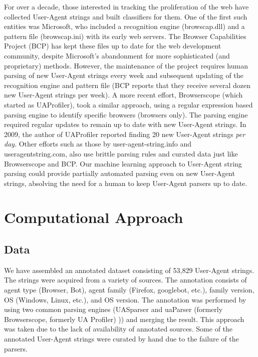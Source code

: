 \documentclass[10pt]{article}
\begin{document}
For over a decade, those interested in tracking the proliferation of the web have collected User-Agent strings and built classifiers for them.  One of the first such entities was Microsoft, who included a recognition engine (browscap.dll) and a pattern file (browscap.ini) with its early web servers.\cite{bcp}  The Browser Capabilities Project (BCP) has kept these files up to date for the web development community, despite Microsoft's abandonment for more sophisticated (and proprietary) methods.\cite{bcp}  However, the maintenance of the project requires human parsing of new User-Agent strings every week and subsequent updating of the recognition engine and pattern file (BCP reports that they receive several dozen new User-Agent strings per week).  A more recent effort, Browserscope (which started as UAProfiler), took a similar approach, using a regular expression based parsing engine to identify specific browsers (browsers only). \cite{souders}  The parsing engine required regular updates to remain up to date with new User-Agent strings.  In 2009, the author of UAProfiler reported finding 20 new User-Agent strings {\it per day}. \cite{souders2}  Other efforts such as those by user-agent-string.info and useragentstring.com, also use brittle parsing rules and curated data just like Browserscope and BCP.  \cite{uas.info,uas.com}   
Our machine learning approach to User-Agent string parsing could provide partially automated parsing even on new User-Agent strings, absolving the need for a human to keep User-Agent parsers up to date.      

\section{Computational Approach}
\subsection{Data}
We have assembled an annotated dataset consisting of 53,829 User-Agent strings.  The strings were acquired from a variety of sources.\cite{ua.org,uatracker,uas.info}  The annotation consists of agent type (Browser, Bot), agent family (Firefox, googlebot, etc.), family version, OS (Windows, Linux, etc.), and OS version.  The annotation was performed by using two common parsing engines (UASparser\cite{uas.info} and uaParser (formerly Browserscope, formerly UA Profiler)\cite{uaParser} )) and merging the result.  This approach was taken due to the lack of availability of annotated sources.  Some of the annotated User-Agent strings were curated by hand due to the failure of the parsers.
\end{document}

